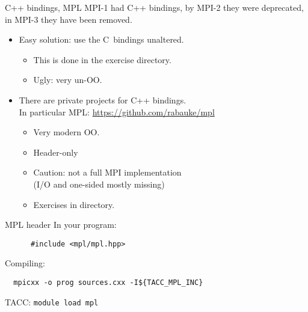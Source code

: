 \begin{mpl}
  \addtocounter{slidecount}{-2}
\begin{numberedframe}{C++ bindings, MPL}
  MPI-1 had C++ bindings, by MPI-2 they were deprecated, in MPI-3 they have been removed.
  \begin{itemize}
  \item Easy solution: use the C~bindings unaltered.
    \begin{itemize}
    \item This is done in the  exercise directory.
    \item Ugly: very un-OO.
    \end{itemize}
  \item There are private projects for C++ bindings.\\
    In particular
    MPL: \url{https://github.com/rabauke/mpl}
    \begin{itemize}
    \item Very modern OO.
    \item Header-only
    \item Caution: not a full MPI implementation\\
      (I/O and one-sided mostly missing)
    \item Exercises in  directory.
    \end{itemize}
  \end{itemize}
\end{numberedframe}

\begin{numberedframe}{MPL header}
    In your program:
    \begin{lstlisting}
      #include <mpl/mpl.hpp>
    \end{lstlisting}
    Compiling:
\begin{verbatim}
  mpicxx -o prog sources.cxx -I${TACC_MPL_INC}
\end{verbatim}
TACC: \texttt{module load mpl}
\end{numberedframe}
\end{mpl}

